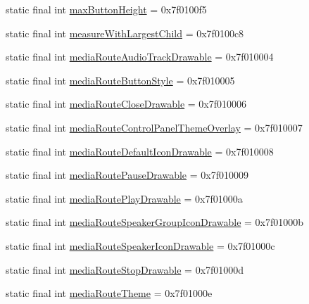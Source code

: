 \begin{CompactItemize}
\item 
static final int \hyperlink{classandroid_1_1support_1_1coreutils_1_1_r_1_1attr_d1768ffe7f18fc78a19ac025ef1350ba}{maxButtonHeight} = 0x7f0100f5
\item 
static final int \hyperlink{classandroid_1_1support_1_1coreutils_1_1_r_1_1attr_e56d9dbcaa044bfeae5ef274f1bf0221}{measureWithLargestChild} = 0x7f0100c8
\item 
static final int \hyperlink{classandroid_1_1support_1_1coreutils_1_1_r_1_1attr_3b671f430d91801fc3af3cee6f4ba269}{mediaRouteAudioTrackDrawable} = 0x7f010004
\item 
static final int \hyperlink{classandroid_1_1support_1_1coreutils_1_1_r_1_1attr_6963f220029749f831d68210e6b22774}{mediaRouteButtonStyle} = 0x7f010005
\item 
static final int \hyperlink{classandroid_1_1support_1_1coreutils_1_1_r_1_1attr_19fced5a577f8ca8ae355f778c26f4e8}{mediaRouteCloseDrawable} = 0x7f010006
\item 
static final int \hyperlink{classandroid_1_1support_1_1coreutils_1_1_r_1_1attr_0f043050c3608918fcc7badf3c0c87cd}{mediaRouteControlPanelThemeOverlay} = 0x7f010007
\item 
static final int \hyperlink{classandroid_1_1support_1_1coreutils_1_1_r_1_1attr_bdd8b52659e5aa419681baaa84e3f804}{mediaRouteDefaultIconDrawable} = 0x7f010008
\item 
static final int \hyperlink{classandroid_1_1support_1_1coreutils_1_1_r_1_1attr_7227f83ef76caffc41513cbfdb72d1b1}{mediaRoutePauseDrawable} = 0x7f010009
\item 
static final int \hyperlink{classandroid_1_1support_1_1coreutils_1_1_r_1_1attr_8dadab713d56028593c42d064abe2181}{mediaRoutePlayDrawable} = 0x7f01000a
\item 
static final int \hyperlink{classandroid_1_1support_1_1coreutils_1_1_r_1_1attr_7628dc1743155381dab9d3d6b9370c14}{mediaRouteSpeakerGroupIconDrawable} = 0x7f01000b
\item 
static final int \hyperlink{classandroid_1_1support_1_1coreutils_1_1_r_1_1attr_c61d03b96a329c4f9d92922dc17db932}{mediaRouteSpeakerIconDrawable} = 0x7f01000c
\item 
static final int \hyperlink{classandroid_1_1support_1_1coreutils_1_1_r_1_1attr_eab785e8e37a17405c20b07fba1ae989}{mediaRouteStopDrawable} = 0x7f01000d
\item 
static final int \hyperlink{classandroid_1_1support_1_1coreutils_1_1_r_1_1attr_219eedceef641d3fb686a627660bcf2f}{mediaRouteTheme} = 0x7f01000e
\item 

\end{CompactItemize}
